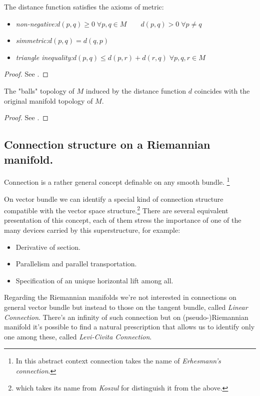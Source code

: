 \documentclass[a4paper,12pt]{scrartcl}    %
\begin{document}
\begin{proposition}
The distance function satisfies the axioms of metric:
\begin{itemize}
	\item  \emph{non-negative:}\quad$d(p,q)\geq 0 \; \forall p,q\in M \qquad d(p,q)>0 \; \forall p\neq q$
	\item \emph{simmetric:}\quad$d(p,q) = d(q,p)$ 
	\item  \emph{triangle inequality:}\quad$d(p,q) \leq d(p,r) + d(r,q) \; \forall p,q,r \in M$
\end{itemize}
\end{proposition}
\begin{proof}
	 See \cite[Lemma $1.4.1$ ]{Jost2005}.
\end{proof}

\begin{corollary}
	 The "balls" topology of $M$ induced by the distance function $d$ coincides with the original manifold topology of $M$.
\end{corollary}
\begin{proof}
		 See \cite[corollary $1.4.2$ ]{Jost2005}.
\end{proof}

\subsection{Connection structure on a Riemannian manifold.}
 Connection is a rather general concept definable on any smooth bundle. \footnote{In this abstract context connection takes the name of \emph{Erhesmann's connection}.}
 
 On vector bundle we can identify a special kind of connection structure compatible with the vector space structure.\footnote{which takes its name from \emph{Koszul} for distinguish it from the above.}
 There are several equivalent presentation of this concept, each of them stress the importance of one of the many devices carried by this superstructure, for example:
 \begin{itemize}
 	\item Derivative of section.
 	\item Parallelism and parallel transportation.
 	\item Specification of an unique horizontal lift among all.
 \end{itemize}
 
 Regarding the Riemannian manifolds we're not interested in connections on general vector bundle but instead to those on the tangent bundle, called \emph{Linear Connection}.
 There's an infinity of such connection but on (pseudo-)Riemannian manifold it's possible to find a natural prescription that allows us to identify only one among these, called \emph{Levi-Civita Connection}.
\end{document}
